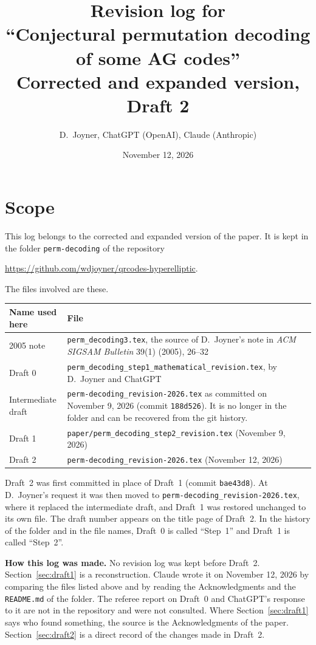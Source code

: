 \documentclass[12pt,letterpaper]{article}
\title{Revision log for\\
``Conjectural permutation decoding of some AG codes''\\[4pt]
\large Corrected and expanded version, Draft 2}
\author{D.~Joyner, ChatGPT (OpenAI), Claude (Anthropic)}
\date{November 12, 2026}
\begin{document}
\maketitle

\section*{Scope}
\noindent This log belongs to the corrected and expanded version of the paper.
It is kept in the folder \texttt{perm-decoding} of the repository
\begin{center}
\url{https://github.com/wdjoyner/qrcodes-hyperelliptic}.
\end{center}
The files involved are these.
\begin{center}\small
\begin{tabular}{@{}l>{\raggedright\arraybackslash}p{}@{}}
\toprule
Name used here & File\\
\midrule
2005 note & \texttt{perm\_decoding3.tex}, the source of D.~Joyner's note in
\emph{ACM SIGSAM Bulletin} 39(1) (2005), 26--32\\
Draft 0 & \texttt{perm\_decoding\_step1\_mathematical\_revision.tex}, by
D.~Joyner and ChatGPT\\
Intermediate draft & \texttt{perm-decoding\_revision-2026.tex} as committed on
November 9, 2026 (commit \texttt{188d526}). It is no longer in the folder and
can be recovered from the git history.\\
Draft 1 & \texttt{paper/perm\_decoding\_step2\_revision.tex} (November 9, 2026)\\
Draft 2 & \texttt{perm-decoding\_revision-2026.tex} (November 12, 2026)\\
\bottomrule
\end{tabular}
\end{center}
Draft~2 was first committed in place of Draft~1 (commit \texttt{bae43d8}). At
D.~Joyner's request it was then moved to \texttt{perm-decoding\_revision-2026.tex},
where it replaced the intermediate draft, and Draft~1 was restored unchanged to
its own file. The draft number appears on the title page of Draft~2. In the
history of the folder and in the file names, Draft~0 is called ``Step~1'' and
Draft~1 is called ``Step~2''.

\medskip
\noindent\textbf{How this log was made.} No revision log was kept before
Draft~2. Section~\ref{sec:draft1} is a reconstruction. Claude wrote it on November
12, 2026 by comparing the files listed above and by reading the Acknowledgments and
the \texttt{README.md} of the folder. The referee report on Draft~0 and ChatGPT's
response to it are not in the repository and were not consulted. Where
Section~\ref{sec:draft1} says who found something, the source is the
Acknowledgments of the paper. Section~\ref{sec:draft2} is a direct record of the
changes made in Draft~2.
\end{document}
